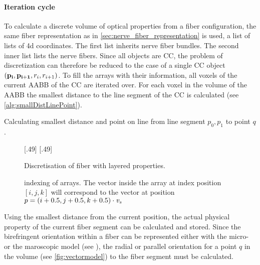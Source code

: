 \paragraph{Iteration cycle}
To calculate a discrete volume of optical properties from a fiber configuration, the same fiber representation as in \cref{sec:nerve_fiber_representation} is used, \ie{} a list of lists of 4d coordinates.
The first list inherits nerve fiber bundles.
The second inner list lists the nerve fibers.
Since all objects are \ac{CC}, the problem of discretization can therefore be reduced to the case of a single \ac{CC} object $(\mathbf{p_i}, \mathbf{p_{i+1}}, r_i, r_{i+1})$.
% 
To fill the arrays with their information, all voxels of the current \ac{AABB} of the \ac{CC} are iterated over.
For each voxel in the volume of the \ac{AABB} the smallest distance to the line segment of the \ac{CC} is calculated (see \cref{alg:smallDistLinePoint}).
\\
% 
\begin{lstfloat}[!tb]

\caption[Calculating smallest distance between line segment and point]{Calculating smallest distance and point on line from line segment $p_0, p_1$ to point $q$.}
\label{alg:smallDistLinePoint}
\end{lstfloat}
% 
\begin{figure}[!t]
\centering
\setlength{\tikzwidth}{0.45\textwidth}
[.49\textwidth]{
} \hfill
{}[.49\textwidth]{
}
\caption{Discretisation of fiber with layered properties.}
\label{fig:fiber_discretisation}
\end{figure}
% 
\begin{figure}[!t]
\centering
\def\tikzwidth{0.42\textwidth}
\caption{indexing of arrays.
The vector inside the array at index position $[i,j,k]$ will correspond to the vector at position $p=(i+0.5,j+0.5,k+0.5) \cdot \textnormal{$\mathit{v_{s}}$}$}
\label{fig:indexing_array}
\end{figure}
% 
Using the smallest distance from the current position, the actual physical property of the current fiber segment can be calculated and stored.
Since the birefringent orientation within a fiber can be represented either with the micro- or the maroscopic model (see \dummy{}), the radial or parallel orientation for a point $q$ in the volume (see \cref{fig:vectormodel}) to the fiber segment must be calculated.
